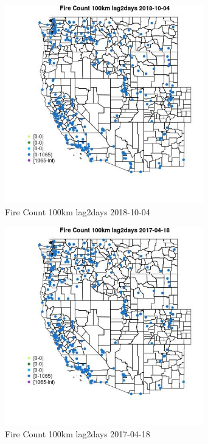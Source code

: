 \begin{figure} 
\centering  
\includegraphics[width=0.77\textwidth]{Code_Outputs/Report_ML_input_PM25_Step4_part_f_de_duplicated_aveswNAs_MapObsFire_Count_100km_lag2days2018-10-04.jpg} 
\caption{\label{fig:Report_ML_input_PM25_Step4_part_f_de_duplicated_aveswNAsMapObsFire_Count_100km_lag2days2018-10-04}Fire Count 100km lag2days 2018-10-04} 
\end{figure} 
 

\begin{figure} 
\centering  
\includegraphics[width=0.77\textwidth]{Code_Outputs/Report_ML_input_PM25_Step4_part_f_de_duplicated_aveswNAs_MapObsFire_Count_100km_lag2days2017-04-18.jpg} 
\caption{\label{fig:Report_ML_input_PM25_Step4_part_f_de_duplicated_aveswNAsMapObsFire_Count_100km_lag2days2017-04-18}Fire Count 100km lag2days 2017-04-18} 
\end{figure} 
 

